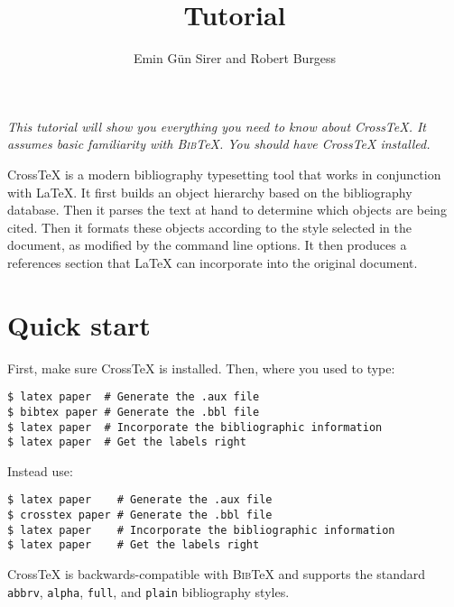 \documentclass{article}
\title{\XTeX{} Tutorial}
\author{Emin G\"un Sirer and Robert Burgess}
\date{}
\newcommand{\XTeX}{Cross\TeX}
\newcommand{\BibTeX}{\textsc{Bib}\TeX}
\begin{document}
\maketitle

\textit{This tutorial will show you everything you need to know about \XTeX{}. It assumes basic familiarity with \BibTeX{}. You should have \XTeX{} installed.}

\XTeX{} is a modern bibliography typesetting tool that works in conjunction with \LaTeX{}. It first builds an object hierarchy based on the bibliography database. Then it parses the text at hand to determine which objects are being cited. Then it formats these objects according to the style selected in the document, as modified by the command line options. It then produces a references section that \LaTeX{} can incorporate into the original document.




\section{Quick start}

First, make sure \XTeX{} is installed. Then, where you used to type:

\begin{small}\begin{verbatim}
$ latex paper  # Generate the .aux file
$ bibtex paper # Generate the .bbl file
$ latex paper  # Incorporate the bibliographic information
$ latex paper  # Get the labels right
\end{verbatim}\end{small}

Instead use:

\begin{small}\begin{verbatim}
$ latex paper    # Generate the .aux file
$ crosstex paper # Generate the .bbl file
$ latex paper    # Incorporate the bibliographic information
$ latex paper    # Get the labels right
\end{verbatim}\end{small}

\XTeX{} is backwards-compatible with \BibTeX{} and supports the standard \texttt{abbrv}, \texttt{alpha}, \texttt{full}, and \texttt{plain} bibliography styles.
\end{document}
